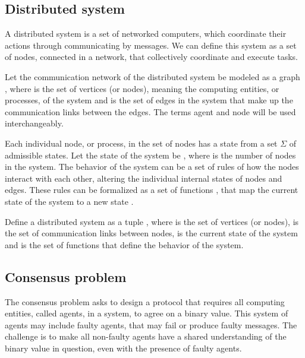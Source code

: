 \subsection{Distributed system} \label{preliminaries_distributed_system}

A distributed system is a set of networked computers, which coordinate their actions through communicating by messages. We can define this system as a set of nodes, connected in a network, that collectively coordinate and execute tasks.

Let the communication network of the distributed system be modeled as a graph , where  is the set of vertices (or nodes), meaning the computing entities, or processes, of the system and  is the set of edges in the system that make up the communication links between the edges. The terms agent and node will be used interchangeably. 

Each individual node, or process, in the set of nodes  has a state from a set $\Sigma$ of admissible states. Let the state of the system be  , where  is the number of nodes in the system. The behavior of the system can be a set of rules of how the nodes interact with each other, altering the individual internal states of nodes and edges. These rules can be formalized as a set of functions , that map the current state of the system  to a new state .

Define a distributed system as a tuple , where  is the set of vertices (or nodes),  is the set of communication links between nodes,  is the current state of the system and  is the set of functions that define the behavior of the system.

\subsection{Consensus problem}

The consensus problem asks to design a protocol that requires all computing entities, called agents, in a system, to agree on a binary value. This system of agents may include faulty agents, that may fail or produce faulty messages. The challenge is to make all non-faulty agents have a shared understanding of the binary value in question, even with the presence of faulty agents. 

